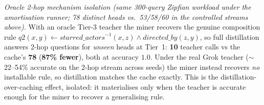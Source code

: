 \begin{table}[t]
\vspace{0.4em}
\noindent\emph{Oracle 2-hop mechanism isolation (same 300-query Zipfian
workload under the amortisation runner; 78 distinct heads vs.\ 53/58/60 in
the controlled streams above).} With an oracle Tier-3 teacher the miner recovers the genuine
composition rule
$q2(x,y)\!\leftarrow\!\mathit{starred\_actors}^{-1}(x,z)\wedge\mathit{directed\_by}(z,y)$,
so full distillation answers 2-hop questions for \emph{unseen} heads at
Tier~1: \textbf{10} teacher calls vs the cache's \textbf{78}
(\textbf{87\% fewer}), both at accuracy $1.0$. Under the real Grok teacher
($\sim$22--54\% accurate on the 2-hop stream across seeds) the miner instead
recovers \emph{no} installable rule, so distillation matches the cache exactly.
This is the distillation-over-caching effect, isolated: it materialises only
when the teacher is accurate enough for the miner to recover a generalising rule.
\end{table}
